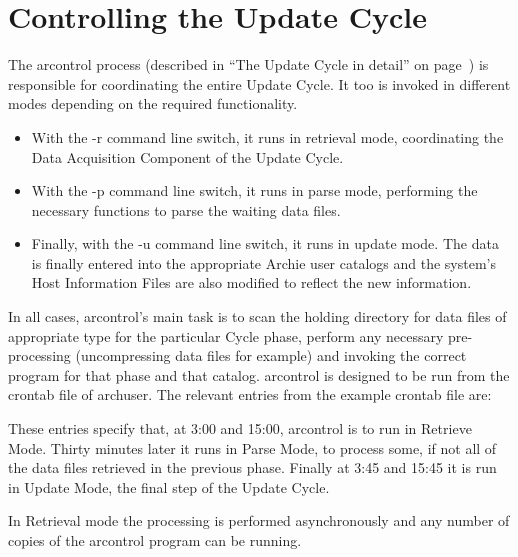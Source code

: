 \section{Controlling the Update Cycle}
\label{sec:control}

The arcontrol process (described in ``The Update Cycle in detail'' on page~\pageref{sec:update}) is responsible for coordinating the entire Update Cycle. It too is invoked in different modes depending on the required functionality. 

\begin{itemize}
\item  With the -r command line switch, it runs in retrieval mode, coordinating the Data Acquisition Component of the Update Cycle.

\item  With the -p command line switch, it runs in parse mode, performing the necessary functions to parse the waiting data files.

\item Finally, with the -u command line switch, it runs in update mode. The data is finally entered into the appropriate Archie user catalogs and the system's Host Information Files are also modified to reflect the new information.
\end{itemize}


In all cases, arcontrol's main task is to scan the holding directory for data files of appropriate type for the particular Cycle phase, perform any necessary pre-processing (uncompressing data files for example) and invoking the correct program for that phase and that catalog. arcontrol is designed to be run from the crontab file of archuser. The relevant entries from the example crontab file are:








These entries specify that, at 3:00 and 15:00, arcontrol is to run in Retrieve Mode. Thirty minutes later it runs in Parse Mode, to process some, if not all of the data files retrieved in the previous phase. Finally at 3:45 and 15:45 it is run in Update Mode, the final step of the Update Cycle.

In Retrieval mode the processing is performed asynchronously and any number of copies of the arcontrol program can be running.


